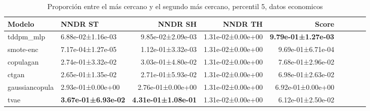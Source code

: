 \begin{table}[H]
\centering
\fontsize{10}{14}\selectfont
\caption{Proporción entre el más cercano y el segundo más cercano, percentil 5, datos economicos}
\label{table-nndr-economicos-a-5th}
\begin{tabular}{|l|l|r|r|r|r|r|r|r|}
\hline
\rowcolor[gray]{0.8}
Modelo & NNDR ST & NNDR SH & NNDR TH & \textbf{Score} \\
\hline tddpm\_mlp & 6.88e-02±1.16e-03 & \cellcolor[rgb]{0.9, 0.54, 0.52} 9.85e-02±2.09e-03 & 1.31e-02±0.00e+00 & \bfseries 9.79e-01±1.27e-03 \\
\hline smote-enc & \cellcolor[rgb]{0.9, 0.54, 0.52} 7.17e-04±1.27e-05 & 1.12e-01±3.32e-03 & 1.31e-02±0.00e+00 & 9.69e-01±6.71e-04 \\
\hline copulagan & 2.74e-01±3.32e-02 & 3.03e-01±4.80e-02 & 1.31e-02±0.00e+00 & 7.68e-01±2.96e-02 \\
\hline ctgan & 2.65e-01±1.35e-02 & 2.71e-01±5.93e-02 & 1.31e-02±0.00e+00 & 6.98e-01±2.63e-02 \\
\hline gaussiancopula & 2.93e-01±0.00e+00 & 2.76e-01±0.00e+00 & 1.31e-02±0.00e+00 & 6.92e-01±0.00e+00 \\
\hline tvae & \bfseries 3.67e-01±6.93e-02 & \bfseries 4.31e-01±1.08e-01 & 1.31e-02±0.00e+00 & \cellcolor[rgb]{0.9, 0.54, 0.52} 6.12e-01±2.50e-02 \\
\hline
\end{tabular}
\end{table}
